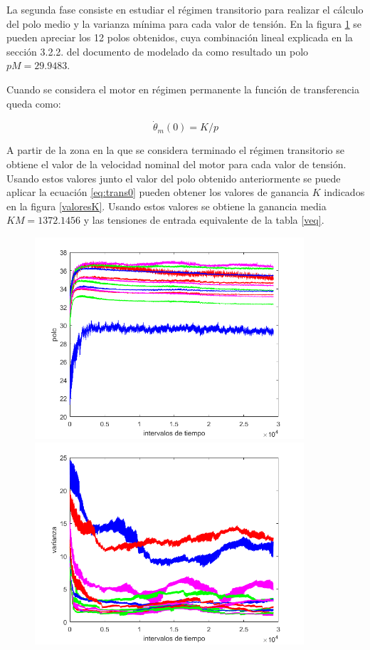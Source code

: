 \documentclass[a4paper]{article}
\begin{document}
La segunda fase consiste en estudiar el régimen transitorio para realizar el cálculo del polo medio y la varianza mínima para cada valor de tensión.
En la figura \ref{polos} se pueden apreciar los 12 polos obtenidos, cuya combinación lineal explicada en la sección 3.2.2. del documento de modelado\cite{modelado}
da como resultado un polo $pM=29.9483$.

Cuando se considera el motor en régimen permanente la función de transferencia queda como:

\begin{equation}
	\label{eq:trans0}
	\dot{\theta}_m (0) = K/p
\end{equation}

A partir de la zona en la que se considera terminado el régimen transitorio se obtiene el valor de la velocidad nominal del motor para cada valor de tensión.
Usando estos valores junto el valor del polo obtenido anteriormente se puede aplicar la ecuación \ref{eq:trans0} pueden obtener los valores de ganancia $K$ indicados en la
figura \ref{valoresK}.
Usando estos valores se obtiene la ganancia media $KM=1372.1456$ y las tensiones de entrada equivalente de la tabla \ref{veq}.

\begin{figure}[htbp]
	\begin{center}
		\includegraphics[width=10cm]{polos}
		\includegraphics[width=10cm]{varianza}
	\end{center}
	\caption{}
	\label{polos}
\end{figure}
\end{document}
